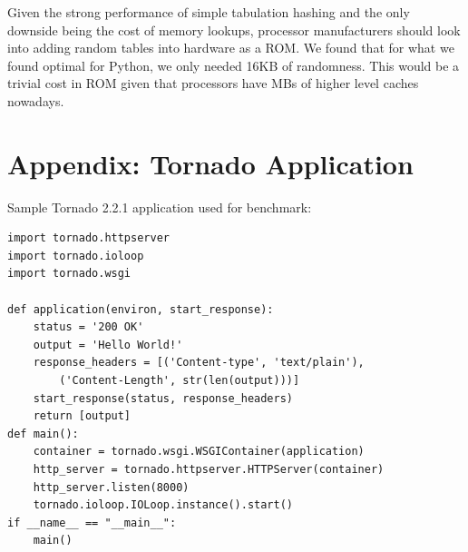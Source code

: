 \documentclass[runningheads,a4paper]{llncs}
\begin{document}
Given the strong performance of simple tabulation hashing and the only downside
being the cost of memory lookups, processor manufacturers should look into
adding random tables into hardware as a ROM.  We found that for what we found
optimal for Python, we only needed 16KB of randomness.  This would be a trivial
cost in ROM given that processors have MBs of higher level caches nowadays.

{}


\appendix
\newpage
\section*{Appendix: Tornado Application}
Sample Tornado 2.2.1 application used for benchmark:
 \begin{verbatim}
import tornado.httpserver
import tornado.ioloop
import tornado.wsgi

def application(environ, start_response):
    status = '200 OK'
    output = 'Hello World!' 
    response_headers = [('Content-type', 'text/plain'),
        ('Content-Length', str(len(output)))]
    start_response(status, response_headers)
    return [output]
def main():
    container = tornado.wsgi.WSGIContainer(application)
    http_server = tornado.httpserver.HTTPServer(container)
    http_server.listen(8000)
    tornado.ioloop.IOLoop.instance().start()
if __name__ == "__main__":
    main()
 \end{verbatim}
\appendix
\end{document}
